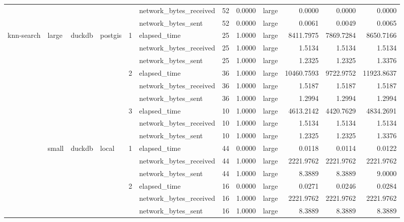 \begin{tabular}{llllllrrlrrr}
 &  &  &  &  & network_bytes_received & 52 & 0.0000 & large & 0.0000 & 0.0000 & 0.0000 \\
 &  &  &  &  & network_bytes_sent & 52 & 0.0000 & large & 0.0061 & 0.0049 & 0.0065 \\
\cline{1-12} \cline{2-12} \cline{3-12} \cline{4-12} \cline{5-12}
\multirow[t]{36}{*}{knn-search} & \multirow[t]{9}{*}{large} & \multirow[t]{9}{*}{duckdb} & \multirow[t]{9}{*}{postgis} & \multirow[t]{3}{*}{1} & elapsed_time & 25 & 1.0000 & large & 8411.7975 & 7869.7284 & 8650.7166 \\
 &  &  &  &  & network_bytes_received & 25 & 1.0000 & large & 1.5134 & 1.5134 & 1.5134 \\
 &  &  &  &  & network_bytes_sent & 25 & 1.0000 & large & 1.2325 & 1.2325 & 1.3376 \\
\cline{5-12}
 &  &  &  & \multirow[t]{3}{*}{2} & elapsed_time & 36 & 1.0000 & large & 10460.7593 & 9722.9752 & 11923.8637 \\
 &  &  &  &  & network_bytes_received & 36 & 1.0000 & large & 1.5187 & 1.5187 & 1.5187 \\
 &  &  &  &  & network_bytes_sent & 36 & 1.0000 & large & 1.2994 & 1.2994 & 1.2994 \\
\cline{5-12}
 &  &  &  & \multirow[t]{3}{*}{3} & elapsed_time & 10 & 1.0000 & large & 4613.2142 & 4420.7629 & 4834.2691 \\
 &  &  &  &  & network_bytes_received & 10 & 1.0000 & large & 1.5134 & 1.5134 & 1.5134 \\
 &  &  &  &  & network_bytes_sent & 10 & 1.0000 & large & 1.2325 & 1.2325 & 1.3376 \\
\cline{2-12} \cline{3-12} \cline{4-12} \cline{5-12}
 & \multirow[t]{27}{*}{small} & \multirow[t]{18}{*}{duckdb} & \multirow[t]{9}{*}{local} & \multirow[t]{3}{*}{1} & elapsed_time & 44 & 0.0000 & large & 0.0118 & 0.0114 & 0.0122 \\
 &  &  &  &  & network_bytes_received & 44 & 1.0000 & large & 2221.9762 & 2221.9762 & 2221.9762 \\
 &  &  &  &  & network_bytes_sent & 44 & 1.0000 & large & 8.3889 & 8.3889 & 9.0000 \\
\cline{5-12}
 &  &  &  & \multirow[t]{3}{*}{2} & elapsed_time & 16 & 0.0000 & large & 0.0271 & 0.0246 & 0.0284 \\
 &  &  &  &  & network_bytes_received & 16 & 1.0000 & large & 2221.9762 & 2221.9762 & 2221.9762 \\
 &  &  &  &  & network_bytes_sent & 16 & 1.0000 & large & 8.3889 & 8.3889 & 8.3889 \\

\end{tabular}

